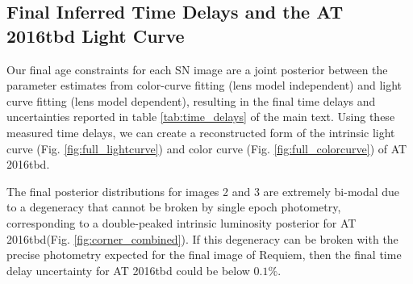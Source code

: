 \documentclass[12pt]{article}
\def\SNABC{AT 2016tbd\xspace}
\begin{document}

\subsection*{Final Inferred Time Delays and the \SNABC Light Curve}

Our final age constraints for each SN image are a joint posterior between the parameter estimates from color-curve fitting (lens model independent) and light curve fitting (lens model dependent), resulting in the final time delays and uncertainties reported in table \ref{tab:time_delays} of the main text. Using these measured time delays, we can create a reconstructed form of the intrinsic light curve (Fig. \ref{fig:full_lightcurve}) and color curve (Fig. \ref{fig:full_colorcurve}) of \SNABC.


The final posterior distributions for images 2 and 3 are extremely bi-modal due to a degeneracy that cannot be broken by single epoch photometry, corresponding to a double-peaked intrinsic luminosity posterior for \SNABC (Fig. \ref{fig:corner_combined}). If this degeneracy can be broken with the precise photometry expected for the final image of Requiem, then the final time delay uncertainty for \SNABC could be below $0.1\%$.
\end{document}
